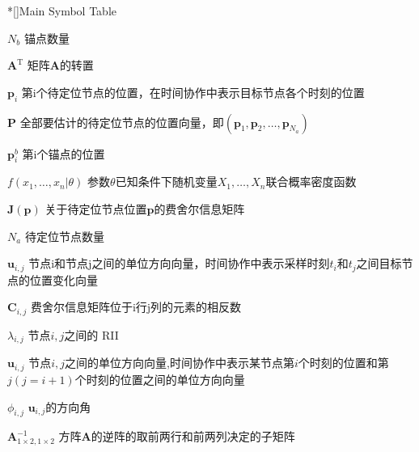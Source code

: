 \documentclass{article}%
\begin{document}
\makeatletter
\newcommand{\thu@denotation@name}{Main Symbol Table}
\NewDocumentCommand{}

\newenvironment{denotation}[1][2.5cm]
{
  \thu@chapter*[]{\thu@denotation@name} %
  \vskip-30bp
\begin{thu@denotation}[labelwidth=#1]
}
{
  \end{thu@denotation}
}
\makeatother

\begin{denotation}[3cm]
\item[$N_b$] 锚点数量
\item[$\bm{A}^{\mathrm{T}}$] 矩阵$\bm{A}$的转置
\item[$\bm{p}_i$] 第i个待定位节点的位置，在时间协作中表示目标节点各个时刻的位置
\item[$\bm{P}$] 全部要估计的待定位节点的位置向量，即$(\bm{p}_1,\bm{p}_2,\dots,\bm{p}_{N_a})$
\item[$\bm{p}^b_i$] 第i个锚点的位置
\item[$f(x_1,\dots,x_n|\theta)$] 参数$\theta$已知条件下随机变量$X_1,\dots,X_n$联合概率密度函数
\item[$\bm{J}(\bm{p})$] 关于待定位节点位置$\bm{p}$的费舍尔信息矩阵
\item[$N_a$] 待定位节点数量
\item[$\bm{u}_{i,j}$] 节点i和节点j之间的单位方向向量，时间协作中表示采样时刻$t_i$和$t_j$之间目标节点的位置变化向量
\item[$\bm{C}_{i,j}$] 费舍尔信息矩阵位于i行j列的元素的相反数
\item[$\lambda_{i,j}$] 节点$i,j$之间的 RII
\item[$\bm{u}_{i,j}$] 节点$i,j$之间的单位方向向量,时间协作中表示某节点第$i$个时刻的位置和第$j(j=i+1)$个时刻的位置之间的单位方向向量
\item[$\phi_{i,j}$] $\bm{u}_{i,j}$的方向角
\item[$\bm{A}^{-1}_{1\times2,1\times2}$] 方阵$\bm{A}$的逆阵的取前两行和前两列决定的子矩阵
\end{denotation}
\end{document}
